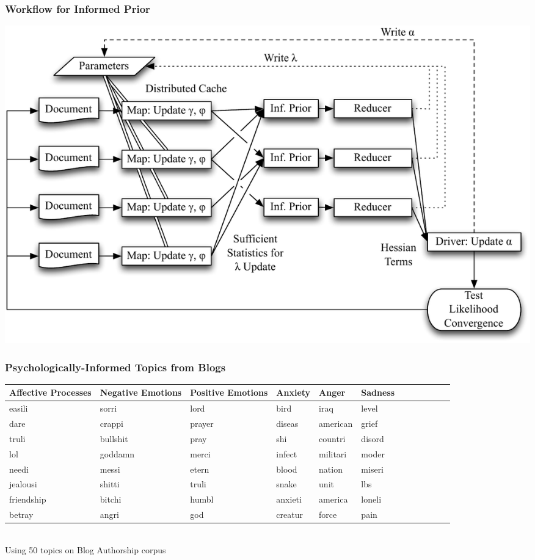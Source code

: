 \begin{frame}
	\frametitle{Workflow for Informed Prior}
	
	\centering
	\includegraphics[width=0.8\linewidth]{mrlda/workflow_informed}
	
\end{frame}


\begin{frame}

\frametitle{Psychologically-Informed Topics from Blogs}

\centering
\scriptsize{
\begin{tabular}{p{1.3cm} p{1.3cm} p{1.3cm} p{1.0cm} p{0.8cm} p{0.7cm} p{1.0cm} p{1.0cm} p{0.8cm} p{1.0cm} p{0.8cm} p{0.9cm}}
\hline
Affective Processes & Negative Emotions & Positive Emotions & Anxiety & Anger & Sadness \\
\hline
 easili & sorri & lord & bird & iraq & level \\
 dare & crappi & prayer & diseas & american & grief \\
 truli & bullshit & pray & shi & countri & disord  \\
 lol & goddamn & merci & infect & militari & moder  \\
 needi & messi & etern & blood & nation & miseri \\
 jealousi & shitti & truli & snake & unit & lbs \\
 friendship & bitchi & humbl & anxieti & america & loneli  \\
 betray & angri & god & creatur & force & pain \\
\hline
\end{tabular}} \\
Using 50 topics on Blog Authorship corpus~\cite{koppel-06}

\end{frame}


